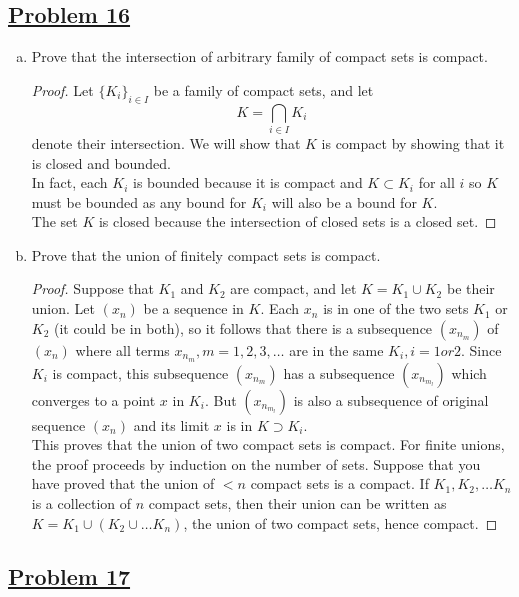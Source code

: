 \documentclass[10pt,letterpaper]{article}
\begin{document}
	\subsection*{{\color{purple}\underline{Problem 16}}}
	\begin{enumerate}[(a)]
	\item Prove that the intersection of arbitrary family of compact sets is compact.
	\begin{proof}
	Let $\{K_i\}_{i\in I}$ be a family of compact sets, and let 
	$$K = \displaystyle\bigcap_{i \in I} K_i$$ denote their intersection. We will show that
	$K$ is compact by showing that it is closed and bounded. \\
	In fact, each $K_i$ is bounded because it is compact and $K \subset K_i$ for all $i$ so
	$K$ must be bounded as any bound for $K_i$ will also be a bound for $K$. \\
	The set $K$ is closed because the intersection of closed sets is a closed set.
	\end{proof}
	
	\item Prove that the union of finitely compact sets is compact.
	\begin{proof}
	Suppose that $K_1$ and $K_2$ are compact, and let $K = K_1 \cup K_2$ be their union.
	Let $(x_n)$ be a sequence in $K$. Each $x_n$ is in one of the two sets $K_1$ or $K_2$ (it could be in both),
	so it follows that there is a subsequence $(x_{n_m})$ of $(x_n)$ where all terms $x_{n_m}, m = 1, 2, 3, \ldots$
	are in the same $K_i, i = 1 or 2$. Since $K_i$ is compact, this subsequence $(x_{n_m})$ has a subsequence $(x_{n_{m_l}})$
	which converges to a point $x$ in $K_i$. But $(x_{n_{m_l}})$ is also a subsequence of original sequence $(x_n)$ and its 
	limit $x$ is in $K \supset K_i$. \\
	This proves that the union of two compact sets is compact. For finite unions, the proof proceeds by induction
	on the number of sets. Suppose that you have proved that the union of $< n$ compact sets is a compact.
	If $K_1, K_2, \ldots K_n$ is a collection of $n$ compact sets, then their union can be written as $K
	 = K_1 \cup (K_2 \cup \ldots K_n)$, the union of two compact sets, hence compact.
	\end{proof}
	\end{enumerate}
	
	\subsection*{{\color{purple}\underline{Problem 17}}}
	
	
	
	
	
	
	
	
	
	
\end{document}
